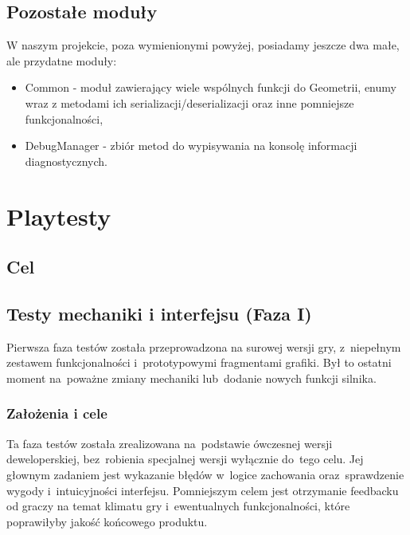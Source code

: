 \documentclass[licencjacka]{pracamgr}
\begin{document}
  \section{Pozostałe moduły}
    W naszym projekcie, poza wymienionymi powyżej, posiadamy jeszcze dwa małe, ale przydatne moduły:
    \begin{itemize}
     \item Common - moduł zawierający wiele wspólnych funkcji do Geometrii, enumy wraz z metodami ich
     serializacji/deserializacji oraz inne pomniejsze funkcjonalności,
     \item DebugManager - zbiór metod do wypisywania na konsolę informacji diagnostycznych.
    \end{itemize}


\chapter{Playtesty}
  \section{Cel}

    \section{Testy mechaniki i interfejsu (Faza I)}
    Pierwsza faza testów została przeprowadzona na surowej wersji gry,
    z~niepełnym zestawem funkcjonalności i~prototypowymi fragmentami grafiki.
    Był to ostatni moment na~poważne zmiany mechaniki lub~dodanie nowych funkcji silnika.

      \subsection{Założenia i cele}
      Ta faza testów została zrealizowana na~podstawie ówczesnej wersji deweloperskiej,
      bez~robienia specjalnej wersji wyłącznie do~tego celu. Jej głownym zadaniem jest
      wykazanie błędów w~logice zachowania oraz~sprawdzenie wygody i~intuicyjności interfejsu.
      Pomniejszym celem jest otrzymanie feedbacku od graczy na temat klimatu gry
      i~ewentualnych funkcjonalności, które poprawiłyby jakość końcowego produktu.
\end{document}
